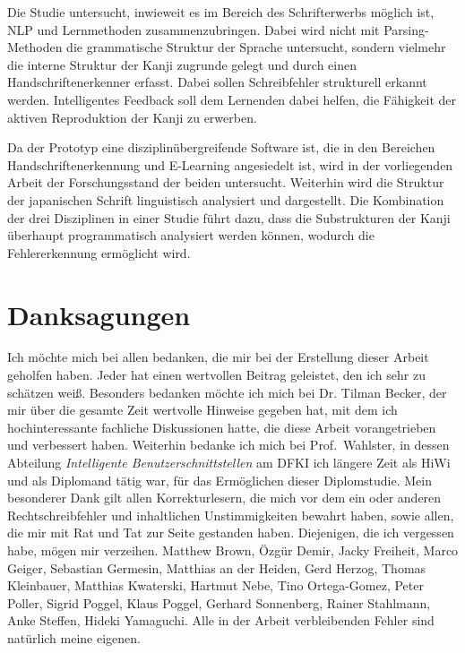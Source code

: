 Die Studie untersucht, inwieweit es im Bereich des Schrifterwerbs möglich ist, 
NLP und Lernmethoden zusammenzubringen. Dabei wird nicht mit Parsing-Methoden die 
grammatische Struktur der Sprache untersucht, sondern vielmehr die interne Struktur 
der Kanji zugrunde gelegt und durch einen Handschriftenerkenner erfasst. 
Dabei sollen Schreibfehler strukturell erkannt werden. Intelligentes Feedback soll 
dem Lernenden dabei helfen, die Fähigkeit der aktiven Reproduktion der Kanji zu 
erwerben.

Da der Prototyp eine disziplinübergreifende Software ist, 
die in den Bereichen Handschriftenerkennung und E-Learning angesiedelt ist,
wird in der vorliegenden Arbeit der Forschungsstand der beiden untersucht.
Weiterhin wird die Struktur der japanischen Schrift linguistisch analysiert und
dargestellt. Die Kombination der drei Disziplinen in einer Studie führt dazu, 
dass die Substrukturen der Kanji überhaupt programmatisch analysiert werden können,
wodurch die Fehlererkennung ermöglicht wird.


\chapter*{Danksagungen}
\label{chap:danksagungen}

Ich möchte mich bei allen bedanken, die mir bei der Erstellung dieser Arbeit 
geholfen haben. Jeder hat einen wertvollen Beitrag geleistet, 
den ich sehr zu schätzen weiß. Besonders bedanken möchte ich mich bei 
Dr. Tilman Becker, der mir über die gesamte Zeit wertvolle Hinweise gegeben hat, mit dem ich 
hochinteressante fachliche Diskussionen hatte, die diese Arbeit vorangetrieben
und verbessert haben. Weiterhin bedanke ich mich bei Prof.\ Wahlster, in dessen 
Abteilung \emph{Intelligente Benutzerschnittstellen} am DFKI ich längere Zeit als HiWi 
und als Diplomand tätig war, für das Ermöglichen dieser Diplomstudie.
Mein besonderer Dank gilt allen Korrekturlesern, die mich vor dem ein oder anderen
Rechtschreibfehler und inhaltlichen Unstimmigkeiten bewahrt haben, sowie allen,
die mir mit Rat und Tat zur Seite gestanden haben. Diejenigen, 
die ich vergessen habe, mögen mir verzeihen.
Matthew Brown,
Özgür Demir,
Jacky Freiheit,
Marco Geiger,
Sebastian Germesin,
Matthias an der Heiden,
Gerd Herzog,
Thomas Kleinbauer,
Matthias Kwaterski, 
Hartmut Nebe,
Tino Ortega-Gomez,
Peter Poller,
Sigrid Poggel,
Klaus Poggel,
Gerhard Sonnenberg,
Rainer Stahlmann,
Anke Steffen,    
Hideki Yamaguchi.  
Alle in der Arbeit verbleibenden Fehler sind natürlich meine eigenen.